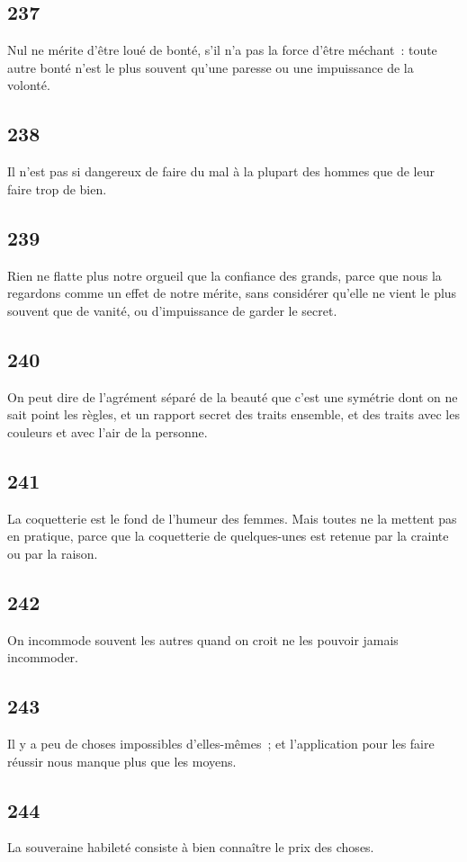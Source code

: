 \documentclass[french,twoside]{book} %
\begin{document}
\subsection[{237}]{ \textsc{237} }
\noindent Nul ne mérite d’être loué de bonté, s’il n’a pas la force d’être méchant : toute autre bonté n’est le plus souvent qu’une paresse ou une impuissance de la volonté.
\subsection[{238}]{ \textsc{238} }
\noindent Il n’est pas si dangereux de faire du mal à la plupart des hommes que de leur faire trop de bien.
\subsection[{239}]{ \textsc{239} }
\noindent Rien ne flatte plus notre orgueil que la confiance des grands, parce que nous la regardons comme un effet de notre mérite, sans considérer qu’elle ne vient le plus souvent que de vanité, ou d’impuissance de garder le secret.
\subsection[{240}]{ \textsc{240} }
\noindent On peut dire de l’agrément séparé de la beauté que c’est une symétrie dont on ne sait point les règles, et un rapport secret des traits ensemble, et des traits avec les couleurs et avec l’air de la personne.
\subsection[{241}]{ \textsc{241} }
\noindent La coquetterie est le fond de l’humeur des femmes. Mais toutes ne la mettent pas en pratique, parce que la coquetterie de quelques-unes est retenue par la crainte ou par la raison.
\subsection[{242}]{ \textsc{242} }
\noindent On incommode souvent les autres quand on croit ne les pouvoir jamais incommoder.
\subsection[{243}]{ \textsc{243} }
\noindent Il y a peu de choses impossibles d’elles-mêmes ; et l’application pour les faire réussir nous manque plus que les moyens.
\subsection[{244}]{ \textsc{244} }
\noindent La souveraine habileté consiste à bien connaître le prix des choses.
\end{document}
